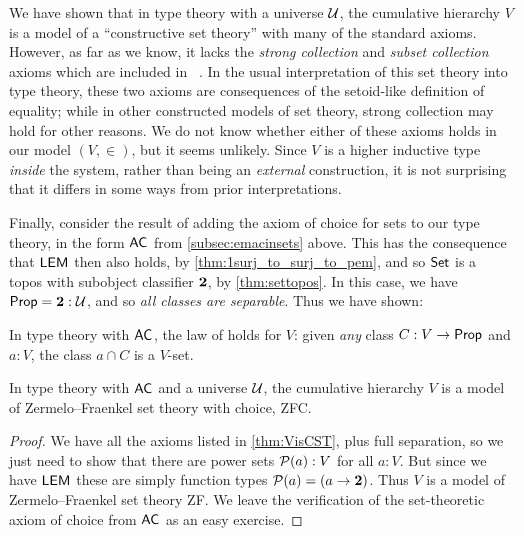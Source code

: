We have shown that in type theory with a universe $\mathcal{U}$, the cumulative hierarchy $V$ is a model of a ``constructive set theory''
%
with many of the standard axioms.
However, as far as we know, it lacks the \emph{strong collection}
%
%
%
and \emph{subset collection}
%
%
%
axioms which are included in \CZF{}~\cite{AczelCZF}.
In the usual interpretation of this set theory into type theory, these two axioms are consequences of the setoid-like definition of equality; while in other constructed models of set theory, strong collection may hold for other reasons.
We do not know whether either of these axioms holds in our model $(V,\in)$, but it seems unlikely.
Since $V$ is a higher inductive type \emph{inside} the system, rather than being an \emph{external} construction, it is not surprising that it differs in some ways from prior interpretations.

Finally, consider the result of adding the axiom of choice for sets to our type theory, in the form  $\mathsf{AC}_{}$ from \cref{subsec:emacinsets} above.  This has the consequence that $\mathsf{LEM}_{}$ then also holds, by \cref{thm:1surj_to_surj_to_pem}, and so $\mathsf{Set}$ is a topos with subobject classifier $\mathbf{2}$, by \cref{thm:settopos}.  In this case, we have $\mathsf{Prop} = \mathbf{2}:\mathcal{U}$, and so \emph{all classes are separable}.
Thus we have shown:

\begin{lem}\label{lem:fullsep}
  In type theory with $\mathsf{AC}_{}$, the law of 
  holds for $V$: given \emph{any} class $C : V \to \mathsf{Prop}$ and $a : V$, the class $a \cap C$ is a $V$-set.
\end{lem}

\begin{thm}\label{thm:zfc}
In type theory with $\mathsf{AC}_{}$ and a universe $\mathcal{U}$, the cumulative hierarchy $V$ is a model of Zermelo--Fraenkel set theory with choice, ZFC.
\end{thm}

\begin{proof}
We have all the axioms listed in \cref{thm:VisCST}, plus full separation, so we just need to show that there are power sets $\mathcal{P}(a):V$ for all $a:V$.  But since we have $\mathsf{LEM}_{}$ these are simply function types $\mathcal{P}(a) = (a\to\mathbf{2})$.  Thus $V$ is a model of Zermelo--Fraenkel set theory ZF. We leave the verification of the set-theoretic axiom of choice from $\mathsf{AC}_{}$ as an easy exercise.
\end{proof}

